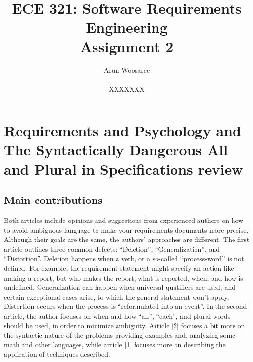 \documentclass[letterpaper,12pt]{article}
\title{ECE 321: Software Requirements Engineering \\ Assignment 2}
\author{Arun Woosaree \\ \\ XXXXXXX}
\begin{document}
\maketitle

\section{Requirements and Psychology
  and
  The Syntactically Dangerous All and Plural in Specifications
  review}

\subsection{Main contributions}
Both articles include opinions and suggestions from experienced authors on how
to avoid ambiguous language to make your requirements documents more precise.
Although their goals are the same, the authors' approaches are different. The
first article outlines three common defects: ``Deletion'', ``Generalization'',
and ``Distortion''. Deletion happens when a verb, or a so-called
``process-word'' is not defined. For example, the requirement statement might
specify an action like making a report, but who makes the report, what is
reported, when, and how is undefined. Generalization can happen when universal
quatifiers are used, and certain exceptional cases arise, to which the general
statement won't apply. Distortion occurs when the process is ``reformulated into
an event''. In the second article, the author focuses on when and how ``all'',
``each'', and plural words should be used, in order to minimize ambiguity.
Article [2] focuses a bit more on the syntactic nature of the problems providing
examples and, analyzing some math and other languages, while article [1] focuses
more on describing the application of techniques described.
\end{document}
